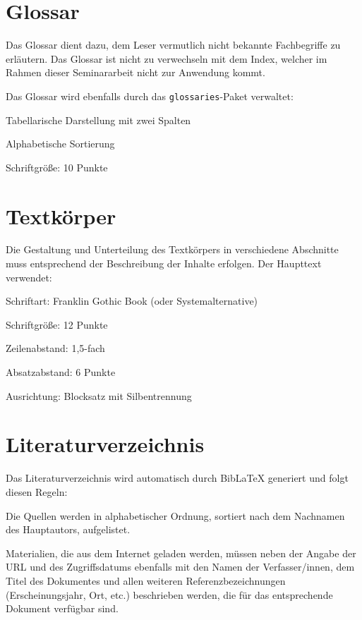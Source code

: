 \section{Glossar}
\label{sec:glossar}

Das Glossar dient dazu, dem Leser vermutlich nicht bekannte Fachbegriffe zu erläutern. Das Glossar ist nicht zu verwechseln mit dem Index, welcher im Rahmen dieser Seminararbeit nicht zur Anwendung kommt.

Das Glossar wird ebenfalls durch das \texttt{glossaries}-Paket verwaltet:
\begin{listenabsatz}
	\item Tabellarische Darstellung mit zwei Spalten
	\item Alphabetische Sortierung
	\item Schriftgröße: 10 Punkte
\end{listenabsatz}

\section{Textkörper}
\label{sec:textkoerper}

Die Gestaltung und Unterteilung des Textkörpers in verschiedene Abschnitte muss entsprechend der Beschreibung der Inhalte erfolgen. Der Haupttext verwendet:
\begin{listenabsatz}
	\item Schriftart: Franklin Gothic Book (oder Systemalternative)
	\item Schriftgröße: 12 Punkte
	\item Zeilenabstand: 1,5-fach
	\item Absatzabstand: 6 Punkte
	\item Ausrichtung: Blocksatz mit Silbentrennung
\end{listenabsatz}

\section{Literaturverzeichnis}
\label{sec:literaturverzeichnis_format}

Das Literaturverzeichnis wird automatisch durch BibLaTeX generiert und folgt diesen Regeln:

Die Quellen werden in alphabetischer Ordnung, sortiert nach dem Nachnamen des Hauptautors, aufgelistet.

Materialien, die aus dem Internet geladen werden, müssen neben der Angabe der URL und des Zugriffsdatums ebenfalls mit den Namen der Verfasser/innen, dem Titel des Dokumentes und allen weiteren Referenzbezeichnungen (Erscheinungsjahr, Ort, etc.) beschrieben werden, die für das entsprechende Dokument verfügbar sind.

